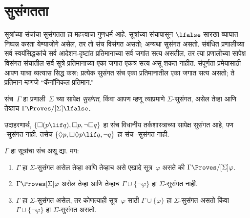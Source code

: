 \section{सुसंगतता}\label{nml:prf:con:sec}

सूत्रांच्या संचांचा सुसंगतता हा महत्त्वाचा
गुणधर्म आहे. सूत्रांच्या संचापासून
$\lfalse$ सारखा व्याघात निष्पन्न करता येण्याजोगे असेल,
तर तो संच विसंगत असतो; अन्यथा सुसंगत असतो.
संबंधित प्रणालीच्या सर्व स्वयंसिद्धकांचे सर्व आदेशन-दृष्टांत
प्रतिमानाच्या सर्व जगांत सत्य असतील, तर त्या प्रणालीच्या सापेक्ष
विसंगत संचातील सर्व सूत्रे प्रतिमानाच्या एका जगात
एकत्र सत्य असू शकत नाहीत. संपूर्णता प्रमेयासाठी आपण याचा
व्यत्यास सिद्ध करू: प्रत्येक सुसंगत संच
एका प्रतिमानातील एका जगात सत्य असतो; ते
प्रतिमान म्हणजे ``कॅनॉनिकल प्रतिमान.''

\begin{defn}
  संच~$\Gamma$ हा प्रणाली~$\Sigma$ च्या सापेक्ष
  \emph{सुसंगत}, किंवा आपण म्हणू त्याप्रमाणे
  $\Sigma$-सुसंगत, असेल तेव्हा आणि तेव्हाच
  $\Gamma \Proves/[\Sigma] \lfalse$.
\end{defn}

उदाहरणार्थ, $\{ \Box(p \lif q), \Box p, \lnot\Box q \}$
हा संच विधानीय तर्कशास्त्राच्या सापेक्ष सुसंगत आहे,
पण -सुसंगत नाही. तसेच
$\{ \Diamond p, \Box\Diamond
p \lif q, \lnot q \}$ हा संच -सुसंगत नाही.

\begin{prop}\label{nml:prf:con:prop:consistencyfacts}
  $\Gamma$ हा सूत्रांचा संच असू द्या. मग:
  \begin{enumerate}
  \item $\Gamma$ हा $\Sigma$-सुसंगत असेल तेव्हा आणि
    तेव्हाच असे एखादे सूत्र~$\varphi$ असते की
    $\Gamma \Proves/[\Sigma] \varphi$.
  \item \label{nml:prf:con:prop:consistencyfacts-b}
    $\Gamma \Proves[\Sigma] \varphi$ असेल तेव्हा आणि
    तेव्हाच $\Gamma \cup \{
    \lnot\varphi \}$ हा $\Sigma$-सुसंगत नाही.
  \item \label{nml:prf:con:prop:consistencyfacts-c}
    $\Gamma$ हा $\Sigma$-सुसंगत असेल, तर
    कोणत्याही सूत्र~$\varphi$ साठी
    $\Gamma \cup \{ \varphi \}$ हा
    $\Sigma$-सुसंगत असतो किंवा
    $\Gamma \cup \{ \lnot\varphi \}$ हा
    $\Sigma$-सुसंगत असतो.
  \end{enumerate}
\end{prop}

